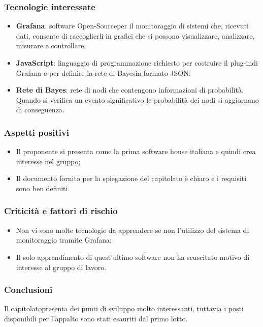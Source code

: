 \subsubsection{Tecnologie interessate}
\begin{itemize}
	\item \textbf{Grafana\glosp}: software Open-Source\glosp per il monitoraggio di sistemi che, ricevuti dati, consente di raccoglierli in grafici che si possono visualizzare, analizzare, misurare e controllare; 
	\item \textbf{JavaScript}: linguaggio di programmazione richiesto per costruire il plug-in\glosp di Grafana e per definire la rete di Bayes\glosp in formato JSON\glo;
	\item \textbf{Rete di Bayes}: rete di nodi che contengono informazioni di probabilità. Quando si verifica un evento significativo le probabilità dei nodi si aggiornano di conseguenza.
\end{itemize}
\subsubsection{Aspetti positivi}
\begin{itemize}
	\item Il proponente si presenta come la prima software house italiana e quindi crea interesse nel gruppo;
	\item Il documento fornito per la spiegazione del capitolato è chiaro e i requisiti sono ben definiti.
\end{itemize}
\subsubsection{Criticità e fattori di rischio}
\begin{itemize}
	\item Non vi sono molte tecnologie da apprendere se non l'utilizzo del sistema di monitoraggio tramite Grafana\glo;
	\item Il solo apprendimento di quest'ultimo software non ha scuscitato motivo di interesse al gruppo di lavoro.
\end{itemize}
\subsubsection{Conclusioni}
Il capitolato\glosp presenta dei punti di sviluppo molto interessanti, tuttavia i posti disponibili per l'appalto sono stati esauriti dal primo lotto.